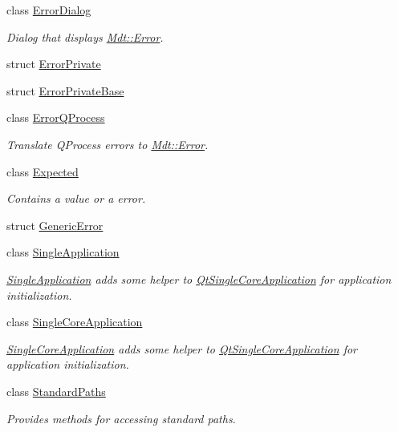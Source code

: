\begin{DoxyCompactItemize}
class \hyperlink{class_mdt_1_1_error_dialog}{Error\+Dialog}
\begin{DoxyCompactList}\small\item\em Dialog that displays \hyperlink{class_mdt_1_1_error}{Mdt\+::\+Error}. \end{DoxyCompactList}\item 
struct \hyperlink{struct_mdt_1_1_error_private}{Error\+Private}
\item 
struct \hyperlink{struct_mdt_1_1_error_private_base}{Error\+Private\+Base}
\item 
class \hyperlink{class_mdt_1_1_error_q_process}{Error\+Q\+Process}
\begin{DoxyCompactList}\small\item\em Translate Q\+Process errors to \hyperlink{class_mdt_1_1_error}{Mdt\+::\+Error}. \end{DoxyCompactList}\item 
class \hyperlink{class_mdt_1_1_expected}{Expected}
\begin{DoxyCompactList}\small\item\em Contains a value or a error. \end{DoxyCompactList}\item 
struct \hyperlink{struct_mdt_1_1_generic_error}{Generic\+Error}
\item 
class \hyperlink{class_mdt_1_1_single_application}{Single\+Application}
\begin{DoxyCompactList}\small\item\em \hyperlink{class_mdt_1_1_single_application}{Single\+Application} adds some helper to \hyperlink{class_qt_single_core_application}{Qt\+Single\+Core\+Application} for application initialization. \end{DoxyCompactList}\item 
class \hyperlink{class_mdt_1_1_single_core_application}{Single\+Core\+Application}
\begin{DoxyCompactList}\small\item\em \hyperlink{class_mdt_1_1_single_core_application}{Single\+Core\+Application} adds some helper to \hyperlink{class_qt_single_core_application}{Qt\+Single\+Core\+Application} for application initialization. \end{DoxyCompactList}\item 
class \hyperlink{class_mdt_1_1_standard_paths}{Standard\+Paths}
\begin{DoxyCompactList}\small\item\em Provides methods for accessing standard paths. \end{DoxyCompactList}\end{DoxyCompactItemize}
